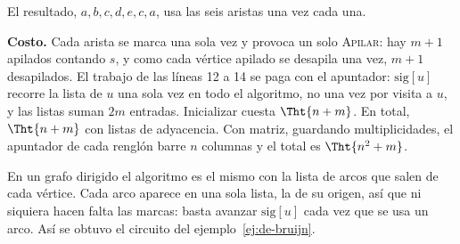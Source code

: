 \documentclass[11pt,letterpaper]{article}
\begin{document}
\begin{ejemplo}
\begin{center}
  \end{center}
  El resultado, $a, b, c, d, e, c, a$, usa las seis aristas una vez
  cada una.
\end{ejemplo}

\textbf{Costo.} Cada arista se marca una sola vez y provoca un solo
\textsc{Apilar}: hay $m + 1$ apilados contando $s$, y como cada vértice
apilado se desapila una vez, $m + 1$ desapilados. El trabajo de las
líneas 12 a 14 se paga con el apuntador: $\text{sig}[u]$ recorre la
lista de $u$ una sola vez en todo el algoritmo, no una vez por visita
a $u$, y las listas suman $2m$ entradas. Inicializar cuesta
$\Tht{n + m}$. En total, $\Tht{n + m}$ con listas de adyacencia. Con
matriz, guardando multiplicidades, el apuntador de cada renglón barre
$n$ columnas y el total es $\Tht{n^{2} + m}$.

En un grafo dirigido el algoritmo es el mismo con la lista de arcos
que salen de cada vértice. Cada arco aparece en una sola lista, la de
su origen, así que ni siquiera hacen falta las marcas: basta avanzar
$\text{sig}[u]$ cada vez que se usa un arco. Así se obtuvo el circuito
del ejemplo~\ref{ej:de-bruijn}.
\end{document}
